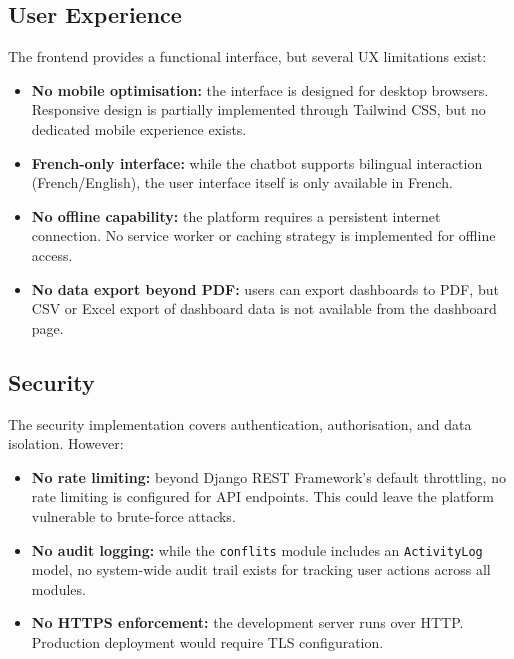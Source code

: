 \subsection{User Experience}

\noindent
The frontend provides a functional interface,
but several UX limitations exist:

\begin{itemize}
  \item \textbf{No mobile optimisation:}
        the interface is designed
        for desktop browsers.
        Responsive design is partially implemented
        through Tailwind CSS,
        but no dedicated mobile experience exists.
  \item \textbf{French-only interface:}
        while the chatbot supports bilingual
        interaction (French/English),
        the user interface itself
        is only available in French.
  \item \textbf{No offline capability:}
        the platform requires
        a persistent internet connection.
        No service worker or caching strategy
        is implemented for offline access.
  \item \textbf{No data export beyond PDF:}
        users can export dashboards to PDF,
        but CSV or Excel export
        of dashboard data is not available
        from the dashboard page.
\end{itemize}

\subsection{Security}

\noindent
The security implementation covers
authentication, authorisation, and data isolation.
However:

\begin{itemize}
  \item \textbf{No rate limiting:}
        beyond Django REST Framework's
        default throttling,
        no rate limiting is configured
        for API endpoints.
        This could leave the platform
        vulnerable to brute-force attacks.
  \item \textbf{No audit logging:}
        while the \texttt{conflits} module
        includes an \texttt{ActivityLog} model,
        no system-wide audit trail
        exists for tracking user actions
        across all modules.
  \item \textbf{No HTTPS enforcement:}
        the development server
        runs over HTTP.
        Production deployment
        would require TLS configuration.
\end{itemize}

